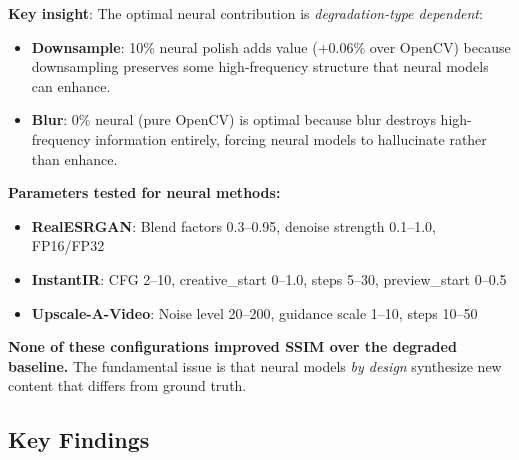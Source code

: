 \documentclass[11pt,a4paper]{article}
\begin{document}
\textbf{Key insight}: The optimal neural contribution is \emph{degradation-type dependent}:
\begin{itemize}
    \item \textbf{Downsample}: 10\% neural polish adds value (+0.06\% over OpenCV) because downsampling preserves some high-frequency structure that neural models can enhance.
    \item \textbf{Blur}: 0\% neural (pure OpenCV) is optimal because blur destroys high-frequency information entirely, forcing neural models to hallucinate rather than enhance.
\end{itemize}

\textbf{Parameters tested for neural methods:}
\begin{itemize}
    \item \textbf{RealESRGAN}: Blend factors 0.3--0.95, denoise strength 0.1--1.0, FP16/FP32
    \item \textbf{InstantIR}: CFG 2--10, creative\_start 0--1.0, steps 5--30, preview\_start 0--0.5
    \item \textbf{Upscale-A-Video}: Noise level 20--200, guidance scale 1--10, steps 10--50
\end{itemize}

\textbf{None of these configurations improved SSIM over the degraded baseline.} The fundamental issue is that neural models \emph{by design} synthesize new content that differs from ground truth.

\subsection{Key Findings}
\end{document}
